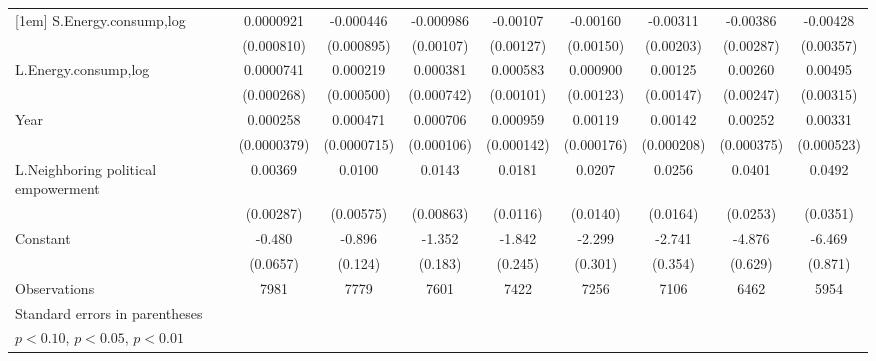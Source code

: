 \begin{table}[htbp]
\begin{tabular}{l*{8}{c}}
[1em]
S.Energy.consump,log&   0.0000921         &   -0.000446         &   -0.000986         &    -0.00107         &    -0.00160         &    -0.00311         &    -0.00386         &    -0.00428         \\
                    &  (0.000810)         &  (0.000895)         &   (0.00107)         &   (0.00127)         &   (0.00150)         &   (0.00203)         &   (0.00287)         &   (0.00357)         \\
[1em]
L.Energy.consump,log&   0.0000741         &    0.000219         &    0.000381         &    0.000583         &    0.000900         &     0.00125         &     0.00260         &     0.00495         \\
                    &  (0.000268)         &  (0.000500)         &  (0.000742)         &   (0.00101)         &   (0.00123)         &   (0.00147)         &   (0.00247)         &   (0.00315)         \\
[1em]
Year                &    0.000258\sym{***}&    0.000471\sym{***}&    0.000706\sym{***}&    0.000959\sym{***}&     0.00119\sym{***}&     0.00142\sym{***}&     0.00252\sym{***}&     0.00331\sym{***}\\
                    & (0.0000379)         & (0.0000715)         &  (0.000106)         &  (0.000142)         &  (0.000176)         &  (0.000208)         &  (0.000375)         &  (0.000523)         \\
[1em]
L.Neighboring political empowerment&     0.00369         &      0.0100\sym{*}  &      0.0143\sym{*}  &      0.0181         &      0.0207         &      0.0256         &      0.0401         &      0.0492         \\
                    &   (0.00287)         &   (0.00575)         &   (0.00863)         &    (0.0116)         &    (0.0140)         &    (0.0164)         &    (0.0253)         &    (0.0351)         \\
[1em]
Constant            &      -0.480\sym{***}&      -0.896\sym{***}&      -1.352\sym{***}&      -1.842\sym{***}&      -2.299\sym{***}&      -2.741\sym{***}&      -4.876\sym{***}&      -6.469\sym{***}\\
                    &    (0.0657)         &     (0.124)         &     (0.183)         &     (0.245)         &     (0.301)         &     (0.354)         &     (0.629)         &     (0.871)         \\
\hline
Observations        &        7981         &        7779         &        7601         &        7422         &        7256         &        7106         &        6462         &        5954         \\
\hline\hline
\multicolumn{9}{l}{\footnotesize Standard errors in parentheses}\\
\multicolumn{9}{l}{\footnotesize \sym{*} \(p<0.10\), \sym{**} \(p<0.05\), \sym{***} \(p<0.01\)}\\
\end{tabular}
\end{table}

